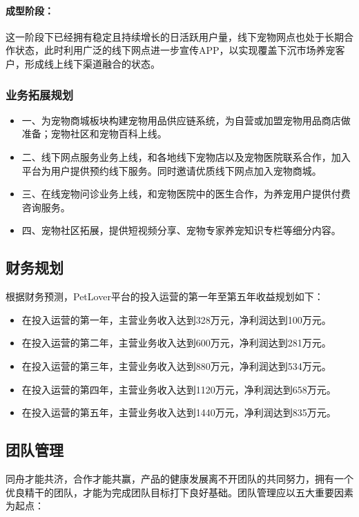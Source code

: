 \documentclass[a4paper]{ctexart}
\begin{document}
\paragraph{成型阶段：}这一阶段下已经拥有稳定且持续增长的日活跃用户量，线下宠物网点也处于长期合作状态，此时利用广泛的线下网点进一步宣传APP，以实现覆盖下沉市场养宠客户，形成线上线下渠道融合的状态。

\subsubsection{业务拓展规划}
\begin{itemize}
  \item 一、为宠物商城板块构建宠物用品供应链系统，为自营或加盟宠物用品商店做准备；宠物社区和宠物百科上线。
  \item 二、线下网点服务业务上线，和各地线下宠物店以及宠物医院联系合作，加入平台为用户提供预约线下服务。同时邀请优质线下网点加入宠物商城。
  \item 三、在线宠物问诊业务上线，和宠物医院中的医生合作，为养宠用户提供付费咨询服务。
  \item 四、宠物社区拓展，提供短视频分享、宠物专家养宠知识专栏等细分内容。
\end{itemize}

\subsection{财务规划}
根据财务预测，PetLover平台的投入运营的第一年至第五年收益规划如下：
\begin{itemize}
  \item 在投入运营的第一年，主营业务收入达到328万元，净利润达到100万元。
  \item 在投入运营的第二年，主营业务收入达到600万元，净利润达到281万元。
  \item 在投入运营的第三年，主营业务收入达到880万元，净利润达到534万元。
  \item 在投入运营的第四年，主营业务收入达到1120万元，净利润达到658万元。
  \item 在投入运营的第五年，主营业务收入达到1440万元，净利润达到835万元。
\end{itemize}

\subsection{团队管理}
同舟才能共济，合作才能共赢，产品的健康发展离不开团队的共同努力，拥有一个优良精干的团队，才能为完成团队目标打下良好基础。团队管理应以五大重要因素为起点：
\end{document}

